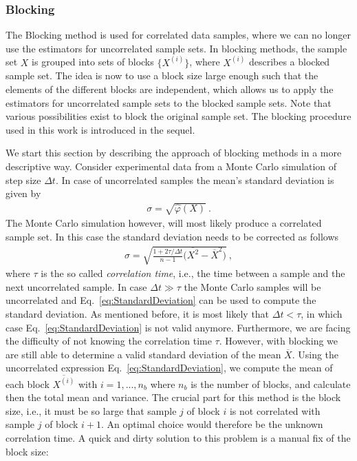 \documentclass[11pt,a4paper]{article}
\numberwithin{equation}{section}
\begin{document}
\subsubsection{Blocking}
%
%
The Blocking method is used for correlated data samples, where we can no longer use the estimators for uncorrelated sample sets.
%
In blocking methods, the sample set $X$ is grouped into sets of blocks $\{X^{(i)}\}$, where $X^{(i)}$ describes a blocked sample set.
%
The idea is now to use a block size large enough such that the elements of the different blocks are independent, which allows us to apply the estimators for uncorrelated sample sets to the blocked sample sets.  
%
Note that various possibilities exist to block the original sample set.
%
The blocking procedure used in this work is introduced in the sequel. 

%
We start this section by describing the approach of blocking methods in a more descriptive way.
%
Consider experimental data from a Monte Carlo simulation of step size $\Delta t$. 
%
In case of uncorrelated samples the mean's standard deviation is given by
\begin{align}
\label{eq:StandardDeviation}
\sigma 
=
\sqrt{
\hat \varphi(X)
}~.
\end{align}
The Monte Carlo simulation however, will most likely produce a correlated sample set.
%
In this case the standard deviation needs to be corrected as follows  
\begin{align*}
\sigma
=
\sqrt{
\frac{1+2\tau/\Delta t}{n-1}\Big(\overline{X^2}-\overline{X}^2\Big)
}~,
\end{align*}
where $\tau$ is the so called {\it correlation time}, i.e., the time between a sample and the next uncorrelated sample.
%
In case $\Delta t\gg\tau$ the Monte Carlo samples will be uncorrelated and Eq.~\eqref{eq:StandardDeviation} can be used to compute the standard deviation.
%
As mentioned before, it is most likely that $\Delta t<\tau$, in which case Eq.~\eqref{eq:StandardDeviation} is not valid anymore. 
%
Furthermore, we are facing the difficulty of not knowing the correlation time $\tau$.
%
However, with blocking we are still able to determine a valid standard deviation of the mean $\overline{X}$.
%
Using the uncorrelated expression Eq.~\eqref{eq:StandardDeviation}, we compute the mean of each block $\overline{X^{(i)}}$ with $i=1,...,n_{b}$ where $n_b$ is the number of blocks, and calculate then the total mean and variance.
%
The crucial part for this method is the block size, i.e., it must be so large that sample $j$ of block $i$ is not correlated with sample $j$ of block $i+1$.
%
An optimal choice would therefore be the unknown correlation time. 
%
A quick and dirty solution to this problem is a manual fix of the block size:
\end{document}
